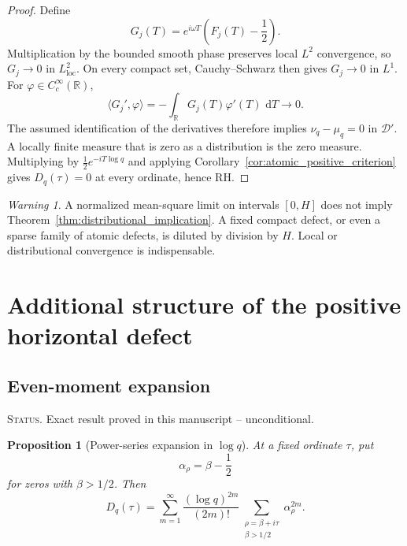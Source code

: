 \documentclass[11pt]{amsart}
\numberwithin{equation}{section}
\theoremstyle{plain}
\newtheorem{proposition}[theorem]{Proposition}
\theoremstyle{definition}
\theoremstyle{remark}
\newtheorem{warning}[theorem]{Warning}
\newcommand{\RH}{\mathrm{RH}}
\newcommand{\1}{\mathbf{1}}
\newcommand{\dd}{\,\mathrm{d}}
\newcommand{\statusnote}[1]{%
  \par\smallskip\noindent
  \begingroup\footnotesize\textsc{Status.} #1\endgroup
  \par\smallskip}
\begin{document}
\begin{proof}
Define
\begin{equation}
G_j(T)
=
e^{i\omega T}\left(F_j(T)-\frac12\right).
\label{eq:distributional_Gj_detailed}
\end{equation}
Multiplication by the bounded smooth phase preserves local \(L^2\)
convergence, so \(G_j\to0\) in \(L^2_{\mathrm{loc}}\).  On every compact
set, Cauchy--Schwarz then gives \(G_j\to0\) in \(L^1\).  For
\(\varphi\in C_c^\infty(\mathbb R)\),
\begin{equation}
\langle G_j',\varphi\rangle
=
-\int_{\mathbb R}G_j(T)\varphi'(T)\,\dd T
\longrightarrow0.
\label{eq:distributional_derivative_limit_detailed}
\end{equation}
The assumed identification of the derivatives therefore implies
\(\nu_q-\mu_q=0\) in \(\mathcal D'\).  A locally finite measure that is
zero as a distribution is the zero measure.  Multiplying by
\(\frac12e^{-iT\log q}\) and applying
Corollary~\ref{cor:atomic_positive_criterion} gives
\(D_q(\tau)=0\) at every ordinate, hence \(\RH\).
\end{proof}

\begin{warning}
\label{warn:global_mean_not_local}
A normalized mean-square limit on intervals \([0,H]\) does not imply
Theorem~\ref{thm:distributional_implication}.  A fixed compact defect, or
even a sparse family of atomic defects, is diluted by division by \(H\).
Local or distributional convergence is indispensable.
\end{warning}


\section{Additional structure of the positive horizontal defect}
\label{sec:additional_positive_defect}

\subsection{Even-moment expansion}
\label{subsec:even_moment_expansion}

\statusnote{Exact result proved in this manuscript -- unconditional.}
\begin{proposition}[Power-series expansion in \(\log q\)]
\label{prop:Dq_power_series}
At a fixed ordinate $\tau$, put
\begin{equation}
\alpha_\rho=\beta-\frac12
\label{eq:alpha_rho_local_definition}
\end{equation}
for zeros with $\beta>1/2$.  Then
\begin{equation}
D_q(\tau)
=
\sum_{m=1}^{\infty}
\frac{(\log q)^{2m}}{(2m)!}
\sum_{\substack{\rho=\beta+i\tau\\\beta>1/2}}
\alpha_\rho^{2m}.
\label{eq:Dq_even_moments}
\end{equation}
\end{proposition}
\end{document}
